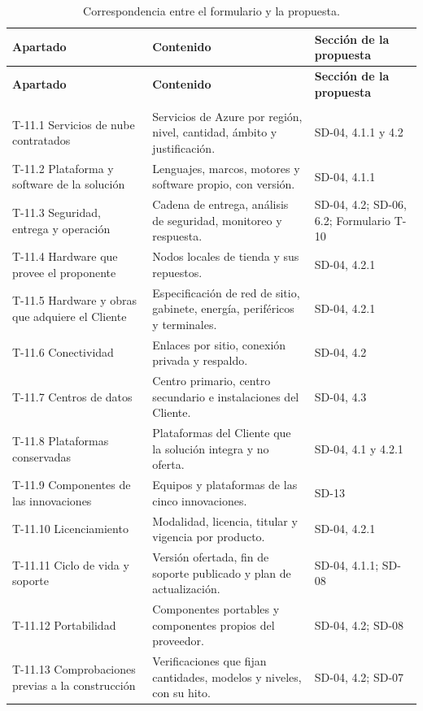 \documentclass[11pt]{article}
\begin{document}
\begin{longtable}[]{@{}
  >{\raggedright\arraybackslash}p{}
  >{\raggedright\arraybackslash}p{}
  >{\raggedright\arraybackslash}p{}@{}}
\caption{Correspondencia entre el formulario y la propuesta.}\label{tab:t11-1}\\
\toprule\noalign{}
\textbf{Apartado} & \textbf{Contenido} & \textbf{Sección de la propuesta} \\
\midrule\noalign{}
\endfirsthead
\toprule\noalign{}
\textbf{Apartado} & \textbf{Contenido} & \textbf{Sección de la propuesta} \\
\midrule\noalign{}
\endhead
\bottomrule\noalign{}
\multicolumn{3}{@{}p{\columnwidth}@{}}{\rule{0pt}{3.2ex}\textbf{Fuente:} Elaboración propia.} \\
\endlastfoot
T-11.1 Servicios de nube contratados & Servicios de Azure por región, nivel, cantidad, ámbito y justificación. & SD-04, 4.1.1 y 4.2 \\ \addlinespace
T-11.2 Plataforma y software de la solución & Lenguajes, marcos, motores y software propio, con versión. & SD-04, 4.1.1 \\ \addlinespace
T-11.3 Seguridad, entrega y operación & Cadena de entrega, análisis de seguridad, monitoreo y respuesta. & SD-04, 4.2; SD-06, 6.2; Formulario T-10 \\ \addlinespace
T-11.4 Hardware que provee el proponente & Nodos locales de tienda y sus repuestos. & SD-04, 4.2.1 \\ \addlinespace
T-11.5 Hardware y obras que adquiere el Cliente & Especificación de red de sitio, gabinete, energía, periféricos y terminales. & SD-04, 4.2.1 \\ \addlinespace
T-11.6 Conectividad & Enlaces por sitio, conexión privada y respaldo. & SD-04, 4.2 \\ \addlinespace
T-11.7 Centros de datos & Centro primario, centro secundario e instalaciones del Cliente. & SD-04, 4.3 \\ \addlinespace
T-11.8 Plataformas conservadas & Plataformas del Cliente que la solución integra y no oferta. & SD-04, 4.1 y 4.2.1 \\ \addlinespace
T-11.9 Componentes de las innovaciones & Equipos y plataformas de las cinco innovaciones. & SD-13 \\ \addlinespace
T-11.10 Licenciamiento & Modalidad, licencia, titular y vigencia por producto. & SD-04, 4.2.1 \\ \addlinespace
T-11.11 Ciclo de vida y soporte & Versión ofertada, fin de soporte publicado y plan de actualización. & SD-04, 4.1.1; SD-08 \\ \addlinespace
T-11.12 Portabilidad & Componentes portables y componentes propios del proveedor. & SD-04, 4.2; SD-08 \\ \addlinespace
T-11.13 Comprobaciones previas a la construcción & Verificaciones que fijan cantidades, modelos y niveles, con su hito. & SD-04, 4.2; SD-07 \\
\end{longtable}
\end{document}

